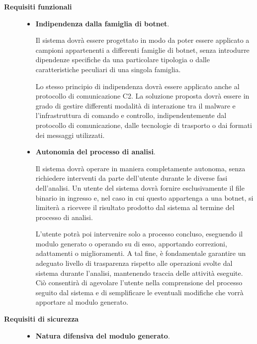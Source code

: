 \begin{description}
    \item[\textbf{Requisiti funzionali}]
    
    \begin{itemize}
        \item \textbf{Indipendenza dalla famiglia di botnet}.

        Il sistema dovrà essere progettato in modo da poter essere applicato a campioni appartenenti a differenti famiglie di botnet, senza introdurre dipendenze specifiche da una particolare tipologia o dalle caratteristiche peculiari di una singola famiglia.

        Lo stesso principio di indipendenza dovrà essere applicato anche al protocollo di comunicazione C2. La soluzione proposta dovrà essere in grado di gestire differenti modalità di interazione tra il malware e l'infrastruttura di comando e controllo, indipendentemente dal protocollo di comunicazione, dalle tecnologie di trasporto o dai formati dei messaggi utilizzati.

        \item \textbf{Autonomia del processo di analisi}.
        
        Il sistema dovrà operare in maniera completamente autonoma, senza richiedere interventi da parte dell'utente durante le diverse fasi dell'analisi. Un utente del sistema dovrà fornire esclusivamente il file binario in ingresso e, nel caso in cui questo appartenga a una botnet, si limiterà a ricevere il risultato prodotto dal sistema al termine del processo di analisi.
        
        L'utente potrà poi intervenire solo a processo concluso, eseguendo il modulo generato o operando su di esso, apportando correzioni, adattamenti o miglioramenti. A tal fine, è fondamentale garantire un adeguato livello di trasparenza rispetto alle operazioni svolte dal sistema durante l'analisi, mantenendo traccia delle attività eseguite. Ciò consentirà di agevolare l'utente nella comprensione del processo seguito dal sistema e di semplificare le eventuali modifiche che vorrà apportare al modulo generato.

    \end{itemize}

    \item[\textbf{Requisiti di sicurezza}]
    
    \begin{itemize}
        \item \textbf{Natura difensiva del modulo generato}.
        

\end{itemize}
\end{description}
